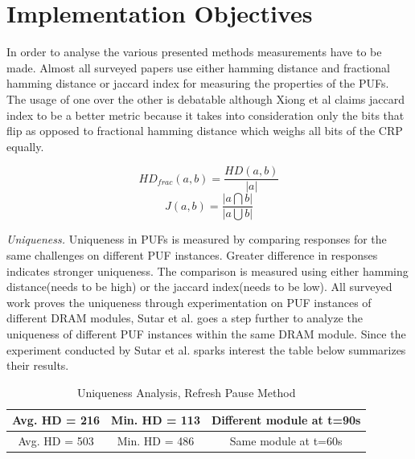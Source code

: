 \documentclass[journal, a4paper]{IEEEtran}
\begin{document}
\section{Implementation Objectives}
In order to analyse the various presented methods measurements have to be made. Almost all surveyed papers use either hamming distance and fractional hamming distance or jaccard index for measuring the properties of the PUFs.\cite{jaccard} The usage of one over the other is debatable although Xiong et al claims jaccard index to be a better metric because it takes into consideration only the bits that flip as opposed to fractional hamming distance which weighs all bits of the CRP equally. 

\[ HD_{frac}(a,b) = \dfrac{HD(a,b)}{|a|} \]
\[ J(a,b) = \dfrac{| a \bigcap b |}{| a \bigcup b |} \]

\textit{Uniqueness.} Uniqueness in PUFs is measured by comparing responses for the same challenges on different PUF instances. Greater difference in responses indicates stronger uniqueness.  The comparison is measured using either hamming distance(needs to be high) or the jaccard index(needs to be low). All surveyed work proves the uniqueness through experimentation on PUF instances of different DRAM modules, Sutar et al. goes a step further to analyze the uniqueness of different PUF instances within the same DRAM module. Since the experiment conducted by Sutar et al. sparks interest the table below summarizes their results.

\begin{table}[!hbt]
    \begin{center}
    \caption{Uniqueness Analysis, Refresh Pause Method}
    \label{tab:simParameters}
    \begin{tabular}{|c|c|c|}
        \hline

        Avg. HD = 216 & Min. HD = 113 & Different module at t=90s \\
        \hline
        Avg. HD = 503 & Min. HD = 486 & Same module at t=60s \\
        \hline

    \end{tabular}
    \end{center}
\end{table}
\end{document}
